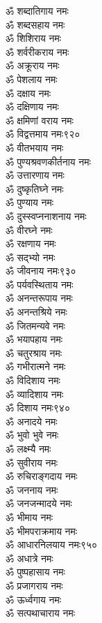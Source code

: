 \begin{center}
\begin{multicols}{2}
\begin{flushleft}
ॐ शब्दातिगाय नमः\\
ॐ शब्दसहाय नमः\\
ॐ शिशिराय नमः\\
ॐ शर्वरीकराय नमः\\
ॐ अक्रूराय नमः\\
ॐ पेशलाय नमः\\
ॐ दक्षाय नमः\\
ॐ दक्षिणाय नमः\\
ॐ क्षमिणां वराय नमः\\
ॐ विद्वत्तमाय नमः\hfill ९२०\\
ॐ वीतभयाय नमः\\
ॐ पुण्यश्रवणकीर्तनाय नमः\\
ॐ उत्तारणाय नमः\\
ॐ दुष्कृतिघ्ने नमः\\
ॐ पुण्याय नमः\\
ॐ दुस्स्वप्ननाशनाय नमः\\
ॐ वीरघ्ने नमः\\
ॐ रक्षणाय नमः\\
ॐ सद्भ्यो  नमः\\
ॐ जीवनाय नमः\hfill ९३०\\
ॐ पर्यवस्थिताय नमः\\
ॐ अनन्तरूपाय नमः\\
ॐ अनन्तश्रिये नमः\\
ॐ जितमन्यवे नमः\\
ॐ भयापहाय नमः\\
ॐ चतुरश्राय नमः\\
ॐ गभीरात्मने नमः\\
ॐ विदिशाय नमः\\
ॐ व्यादिशाय नमः\\
ॐ दिशाय नमः\hfill ९४०\\
ॐ अनादये नमः\\
ॐ भुवो भुवे नमः\\
ॐ लक्ष्म्यै नमः\\
ॐ सुवीराय नमः\\
ॐ रुचिराङ्गदाय नमः\\
ॐ जननाय नमः\\
ॐ जनजन्मादये नमः\\
ॐ भीमाय नमः\\
ॐ भीमपराक्रमाय नमः\\
ॐ आधारनिलयाय नमः\hfill ९५०\\
ॐ अधात्रे नमः\\
ॐ पुष्पहासाय नमः\\
ॐ प्रजागराय नमः\\
ॐ ऊर्ध्वगाय नमः\\
ॐ सत्पथाचाराय नमः\\

\end{flushleft}
\end{multicols}
\end{center}

